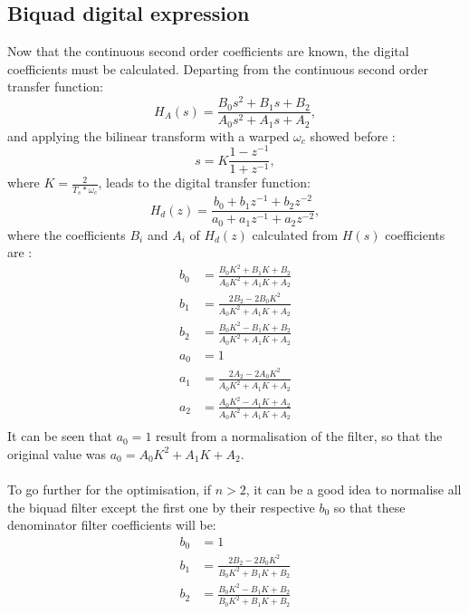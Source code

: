 \documentclass[twoside,twocolumn]{article}
\begin{document}
\subsection{Biquad digital expression}
Now that the continuous second order coefficients are known, the digital coefficients must be calculated.
Departing from the continuous second order transfer function:
\begin{equation}
H_A(s)=\frac{B_0s^2 + B_1s + B_2}{A_0s^2 + A_1s + A_2},
\label{biquadcont}
\end{equation}
and applying the bilinear transform with a warped $\omega_c$ showed before :
\begin{equation}
s=K \frac{1-z^{-1}}{1+z^{-1}},
\end{equation} 
where $K=\frac{2}{T_s*\omega_c}$, leads to the digital transfer function:
\begin{equation}
H_d(z)=\frac{b_0 + b_1z^{-1} + b_2z^{-2}}{a_0 + a_1z^{-1} + a_2z^{-2}},
\end{equation}
where the coefficients $B_i$ and $A_i$ of $H_d(z)$ calculated from $H(s)$ coefficients are :
\begin{equation}
\begin{split}
b_0&=\frac{B_0K^2+B_1K+B_2}{A_0K^2+A_1K+A_2}\\
b_1&=\frac{2B_2-2B_0K^2}{A_0K^2+A_1K+A_2}\\
b_2&=\frac{B_0K^2-B_1K+B_2}{A_0K^2+A_1K+A_2}\\
a_0&=1\\
a_1&=\frac{2A_2-2A_0K^2}{A_0K^2+A_1K+A_2}\\
a_2&=\frac{A_0K^2-A_1K+A_2}{A_0K^2+A_1K+A_2}\\
\end{split}
\end{equation} 
It can be seen that $a_0=1$ result from a normalisation of the filter, so that the original value was $a_0=A_0K^2+A_1K+A_2$.\\ \\
To go further for the optimisation, if $n>2$, it can be a good idea to normalise all the biquad filter except the first one by their respective $b_0$ so that these denominator filter coefficients will be:
\begin{equation}
\begin{split}
b_0&=1\\
b_1&=\frac{2B_2-2B_0K^2}{B_0K^2+B_1K+B_2}\\
b_2&=\frac{B_0K^2-B_1K+B_2}{B_0K^2+B_1K+B_2}\\
\end{split}
\end{equation}
\end{document}
